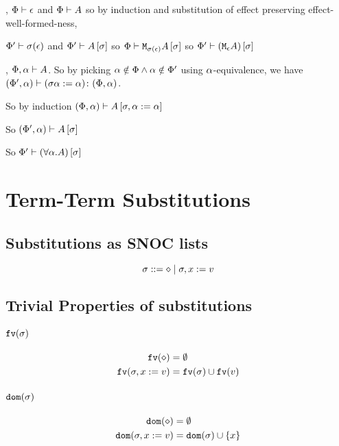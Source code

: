 {    \bi, $\Phi\vdash \epsilon$ and $\Phi\vdash A$ so by induction and substitution of effect preserving effect-well-formed-ness, 

    $\Phi'\vdash \sigma(\epsilon)$ and $\Phi'\vdash A\left[\sigma\right]$ so $\Phi\vdash \texttt{M}_{\sigma(\epsilon)}{A\left[\sigma\right]}$ so $\Phi'\vdash (\texttt{M}_{\epsilon}{A})\left[\sigma\right]$

    \bi, $\Phi,\alpha\vdash A$. So by picking $\alpha\notin\Phi\wedge\alpha\notin\Phi'$ using $\alpha$-equivalence, we have $(\Phi',\alpha) \vdash (\sigma\alpha:=\alpha) \colon (\Phi,\alpha)$.

    So by induction $(\Phi, \alpha)\vdash A\left[\sigma,\alpha:=\alpha\right]$

    So $(\Phi',\alpha)\vdash A\left[\sigma\right]$

    So $\Phi'\vdash (\forall \alpha. A)\left[\sigma\right]$
    
    \section{Term-Term Substitutions}
    \subsection{Substitutions as SNOC lists}

    \begin{equation}
       \sigma ::= \diamond \mid \sigma, x := v
    \end{equation}

    \subsection{Trivial Properties of substitutions}
    \paragraph{$\texttt{fv}(\sigma)$}
    \begin{align}
        \texttt{fv}(\diamond) &= \emptyset\\
        \texttt{fv}(\sigma, x:= v) &= \texttt{fv}(\sigma)\cup\texttt{fv}(v)
    \end{align}
    \paragraph{$\texttt{dom}(\sigma)$}
    \begin{align}
        \texttt{dom}(\diamond) & = \emptyset\\
        \texttt{dom}(\sigma, x:= v) & = \texttt{dom}(\sigma)\cup\left\{x\right\}
    \end{align}

}
